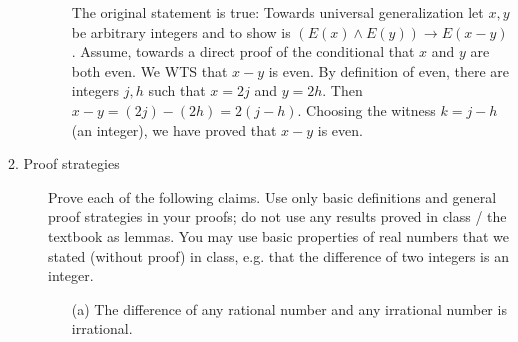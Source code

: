 \documentclass[12pt, oneside]{article}
\begin{document}
\begin{description}
\begin{enumerate}
{  The original statement is true: Towards universal generalization let $x,y$ be arbitrary integers and
  to show is $( E(x) \wedge E(y) ) \to E(x-y)$. Assume, towards
  a direct proof of the conditional that $x$ and $y$ are both even. We WTS that $x-y$ is even.  By definition of even, 
  there are integers $j, h$ such that $x=2j$ and $y=2h$.  Then $x-y = (2j) - (2h) = 2(j-h)$.
  Choosing the  witness $k=j-h$ (an integer), we have proved that $x - y$ is even.
  }
  \else{}
  \fi
  \end{enumerate}
  
  
  \item[2. Proof strategies] Prove each of the following claims.
  Use only basic definitions and general proof strategies in your proofs; 
  do not use any results proved in class / the textbook as lemmas. You may use basic 
  properties of real numbers that we stated (without proof) in class, e.g. that the difference of two
  integers is an integer.
  \begin{enumerate}
  \item[(a)] The difference of any rational number and any irrational number is irrational.
  
  \ifsolution
\end{enumerate}
\end{description}
\end{document}
